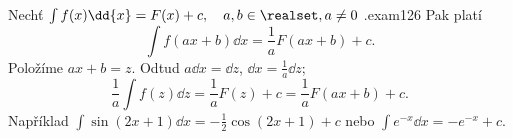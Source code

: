 \begin{mathexam}{Nechť \(\int{f(x)}\dd{x} = F(x) + c, \quad a,b\in\realset, a\neq0\)
  \hfill\cite[s.~261]{Brabec1989}.}{exam126}
  Pak platí
  \begin{equation}\label{mai:eq138}
    \int{f(ax + b)}\dd{x} = \frac{1}{a}F(ax + b) + c.
  \end{equation}
  Položíme \(ax + b =z\). Odtud \(a\dd{x} = \dd{z}\), \(\dd{x} = \frac{1}{a}\dd{z}\); 
  \begin{equation*}
    \boxed{\frac{1}{a}\int{f(z)}\dd{z} = \frac{1}{a}F(z) + c = \frac{1}{a}F(ax+b) + c.}
  \end{equation*}
  Například \(\int{\sin(2x+1)}\dd{x} = -\frac{1}{2}\cos(2x + 1) + c\) nebo \(\int{e^{-x}}\dd{x} =
  -e^{-x} + c\). 
\end{mathexam}